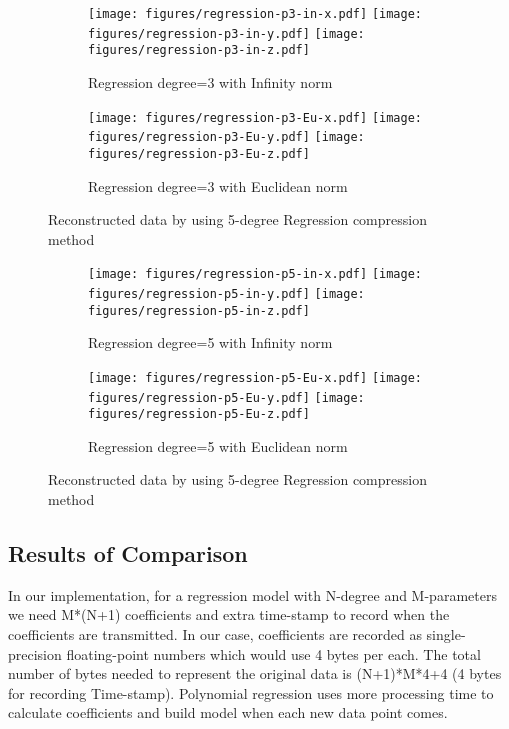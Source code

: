 \begin{figure*}
\centering
\begin{subfigure}{\columnwidth}
\centering
\texttt{[image: figures/regression-p3-in-x.pdf]}
\texttt{[image: figures/regression-p3-in-y.pdf]}
\texttt{[image: figures/regression-p3-in-z.pdf]}
\caption{Regression degree=3 with Infinity norm}
\end{subfigure}

\centering
\begin{subfigure}{\columnwidth}
\centering
\texttt{[image: figures/regression-p3-Eu-x.pdf]}
\texttt{[image: figures/regression-p3-Eu-y.pdf]}
\texttt{[image: figures/regression-p3-Eu-z.pdf]}
\caption{Regression degree=3 with Euclidean norm}
\end{subfigure}

\caption{Reconstructed data by using 5-degree Regression compression method}
\label{fig:poly-regression-3-degree}
\end{figure*}


\begin{figure*}
\centering
\begin{subfigure}{\columnwidth}
\centering
\texttt{[image: figures/regression-p5-in-x.pdf]}
\texttt{[image: figures/regression-p5-in-y.pdf]}
\texttt{[image: figures/regression-p5-in-z.pdf]}
\caption{Regression degree=5 with Infinity norm}
\end{subfigure}

\centering
\begin{subfigure}{\columnwidth}
\centering
\texttt{[image: figures/regression-p5-Eu-x.pdf]}
\texttt{[image: figures/regression-p5-Eu-y.pdf]}
\texttt{[image: figures/regression-p5-Eu-z.pdf]}
\caption{Regression degree=5 with Euclidean norm}
\end{subfigure}

\caption{Reconstructed data by using 5-degree Regression compression method}
\label{fig:poly-regression-5-degree}
\end{figure*}

\subsection{Results of Comparison}
In our implementation, for a regression model with N-degree and M-parameters we
need M*(N+1) coefficients and extra time-stamp to record when the coefficients
are transmitted. In our case, coefficients are recorded as single-precision
floating-point numbers which would use 4 bytes per each. The total number of
bytes needed to represent the original data is (N+1)*M*4+4 (4 bytes for
recording Time-stamp). Polynomial regression uses more processing time  to calculate coefficients and build model when each new data point
comes. 

